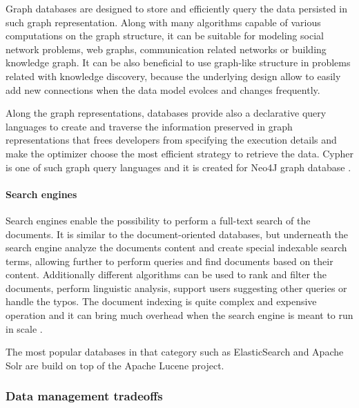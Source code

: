 Graph databases are designed to store and efficiently query the data persisted in such graph representation. Along with many algorithms capable of various computations on the graph structure, it can be suitable for modeling social network problems, web graphs, communication related networks or building knowledge graph. It can be also beneficial to use graph-like structure in problems related with knowledge discovery, because the underlying design allow to easily add new connections when the data model evolces and changes frequently.

Along the graph representations, databases provide also a declarative query languages to create and traverse the information preserved in graph representations that frees developers from specifying the execution details and make the optimizer choose the most efficient strategy to retrieve the data. Cypher is one of such graph query languages and it is created for Neo4J graph database \cite{DesignDataIntensiveApplications}.

\paragraph*{Search engines}

Search engines enable the possibility to perform a full-text search of the documents. It is similar to the document-oriented databases, but underneath the search engine analyze the documents content and create special indexable search terms, allowing further to perform queries and find documents based on their content. Additionally different algorithms can be used to rank and filter the documents, perform linguistic analysis, support users suggesting other queries or handle the typos. The document indexing is quite complex and expensive operation and it can bring much overhead when the search engine is meant to run in scale \cite{DesignDataIntensiveApplications}. 

The most popular databases in that category such as ElasticSearch and Apache Solr are build on top of the Apache Lucene project.

\subsubsection{Data management tradeoffs}



